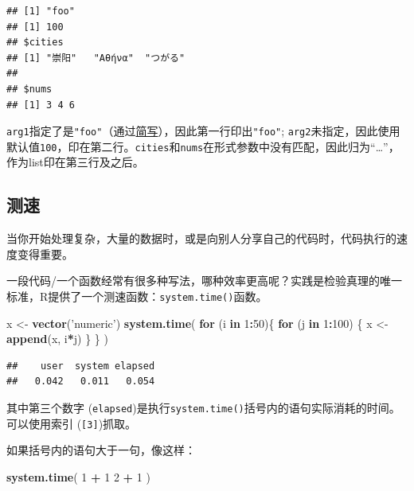 \documentclass[]{book}
\newenvironment{Shaded}{\begin{snugshade}}{\end{snugshade}}
\newcommand{\ControlFlowTok}[1]{\textcolor[rgb]{0.13,0.29,0.53}{\textbf{#1}}}
\newcommand{\DecValTok}[1]{\textcolor[rgb]{0.00,0.00,0.81}{#1}}
\newcommand{\KeywordTok}[1]{\textcolor[rgb]{0.13,0.29,0.53}{\textbf{#1}}}
\newcommand{\NormalTok}[1]{#1}
\newcommand{\OperatorTok}[1]{\textcolor[rgb]{0.81,0.36,0.00}{\textbf{#1}}}
\newcommand{\StringTok}[1]{\textcolor[rgb]{0.31,0.60,0.02}{#1}}
\begin{document}
\begin{verbatim}
## [1] "foo"
## [1] 100
## $cities
## [1] "崇阳"   "Αθήνα"  "つがる"
## 
## $nums
## [1] 3 4 6
\end{verbatim}

\texttt{arg1}指定了是\texttt{"foo"}（通过\protect\hyperlink{abbr}{简写}），因此第一行印出\texttt{"foo"}; \texttt{arg2}未指定，因此使用默认值\texttt{100}，印在第二行。\texttt{cities}和\texttt{nums}在形式参数中没有匹配，因此归为``\ldots{}''，作为list印在第三行及之后。

\hypertarget{system-time}{%
\subsection{测速}\label{system-time}}

当你开始处理复杂，大量的数据时，或是向别人分享自己的代码时，代码执行的速度变得重要。

一段代码/一个函数经常有很多种写法，哪种效率更高呢？实践是检验真理的唯一标准，R提供了一个测速函数：\texttt{system.time()}函数。

\begin{Shaded}
\begin{Highlighting}[]
\NormalTok{x <-}\StringTok{ }\KeywordTok{vector}\NormalTok{(}\StringTok{'numeric'}\NormalTok{)}
\KeywordTok{system.time}\NormalTok{(}
  \ControlFlowTok{for}\NormalTok{ (i }\ControlFlowTok{in} \DecValTok{1}\OperatorTok{:}\DecValTok{50}\NormalTok{)\{}
    \ControlFlowTok{for}\NormalTok{ (j }\ControlFlowTok{in} \DecValTok{1}\OperatorTok{:}\DecValTok{100}\NormalTok{) \{}
\NormalTok{      x <-}\StringTok{ }\KeywordTok{append}\NormalTok{(x, i}\OperatorTok{*}\NormalTok{j)}
\NormalTok{    \}}
\NormalTok{  \}}
\NormalTok{)}
\end{Highlighting}
\end{Shaded}

\begin{verbatim}
##    user  system elapsed 
##   0.042   0.011   0.054
\end{verbatim}

其中第三个数字 (\texttt{elapsed})是执行\texttt{system.time()}括号内的语句实际消耗的时间。可以使用索引 (\texttt{{[}3{]}})抓取。

如果括号内的语句大于一句，像这样：

\begin{Shaded}
\begin{Highlighting}[]
\KeywordTok{system.time}\NormalTok{(}
  \DecValTok{1} \OperatorTok{+}\StringTok{ }\DecValTok{1}
  \DecValTok{2} \OperatorTok{+}\StringTok{ }\DecValTok{1}
\NormalTok{)}
\end{Highlighting}
\end{Shaded}
\end{document}

